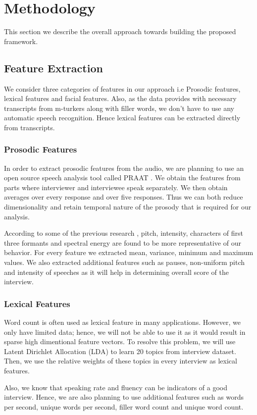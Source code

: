 \section{Methodology}
This section we describe the overall approach towards building the proposed framework.
\subsection{Feature Extraction}
We consider three categories of features in our approach i.e Prosodic features, lexical features and facial features. Also, as the data provides with necessary transcripts from m-turkers along with filler words, we don't have to use any automatic speech recognition. Hence lexical features can be extracted directly from transcripts.
\subsubsection{Prosodic Features}
In order to extract prosodic features from the audio, we are planning to use an open source speech analysis tool called PRAAT \cite{naim2015automated}. We obtain the features from parts where interviewer and interviewee speak separately. We then obtain averages over every response and over five responses. Thus we can both reduce dimensionality and retain temporal nature of the prosody that is required for our analysis.

According to some of the previous research \cite{frick1985communicating}, pitch, intensity, characters of first three formants and spectral energy are found to be more representative of our behavior. For every feature we extracted mean, variance, minimum and maximum values. We also extracted additional features such as pauses, non-uniform pitch and intensity of speeches as it will help in determining overall score of the interview.
\subsubsection{Lexical Features}
Word count is often used as lexical feature in many applications. However, we only have limited data; hence, we will not be able to use it as it would result in sparse high dimentional feature vectors. To resolve this problem, we will use Latent Dirichlet Allocation (LDA) to learn 20 topics from interview dataset. Then, we use the relative weights of these topics in every interview as lexical features.

Also, we know that speaking rate and fluency can be indicators of a good interview. Hence, we are also planning to use additional features such as words per second, unique words per second, filler word count and unique word count. 
